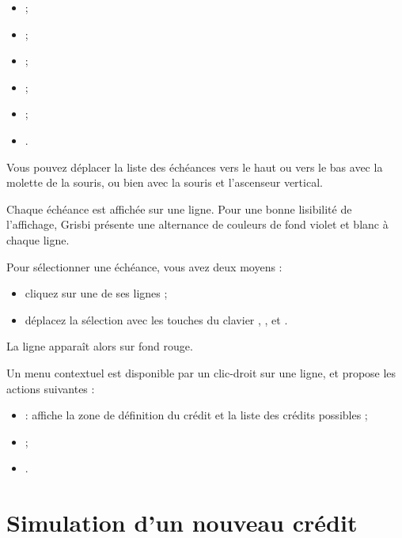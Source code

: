 \begin{itemize}
	 \item {} ;
	 \item {} ;
	 \item {} ;
	 \item {} ;
	 \item {} ;
	 \item {}.
\end{itemize}

Vous pouvez déplacer la liste des échéances vers le haut ou vers le bas avec la molette de la souris, ou bien avec la souris et l'ascenseur vertical. 


Chaque échéance est affichée sur une ligne. Pour une bonne lisibilité de l'affichage, Grisbi présente une alternance de couleurs de fond violet et blanc{\couleurs} à chaque ligne.

Pour sélectionner une échéance, vous avez deux moyens :
\begin{itemize}
	 \item cliquez sur une de ses lignes ;
	 \item déplacez la sélection avec les touches du clavier , , et .
\end{itemize}
La ligne apparaît alors sur fond rouge{\couleur}.

Un menu contextuel est disponible par un clic-droit sur une ligne, et propose les actions suivantes :

\begin{itemize}
	 \item {} : affiche la zone de définition du crédit et la liste des crédits possibles ;
	 \item {} ;
	 \item {}.
\end{itemize}


\section{Simulation d'un nouveau crédit\label{credit-new}}


